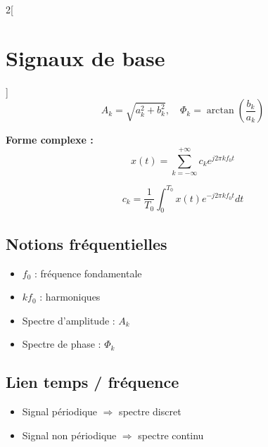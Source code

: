 \documentclass[a4paper,10pt]{article}
\begin{document}
\begin{multicols}{2}[
        \section{Signaux de base}
    ]
        \[
        A_k = \sqrt{a_k^2 + b_k^2}, \quad \Phi_k = \arctan\left(\frac{b_k}{a_k}\right)
        \]

        \textbf{Forme complexe :}
        \[
        x(t) = \sum_{k=-\infty}^{+\infty} c_k e^{j2\pi k f_0 t}
        \]

        \[
        c_k = \frac{1}{T_0} \int_0^{T_0} x(t)e^{-j2\pi k f_0 t} dt
        \]

        \subsection*{Notions fréquentielles}

        \begin{itemize}
            \item $f_0$ : fréquence fondamentale
            \item $k f_0$ : harmoniques
            \item Spectre d'amplitude : $A_k$
            \item Spectre de phase : $\Phi_k$
        \end{itemize}


        
        \subsection*{Lien temps / fréquence}

        \begin{itemize}
            \item Signal périodique $\Rightarrow$ spectre discret
            \item Signal non périodique $\Rightarrow$ spectre continu
        \end{itemize}
            
    \end{multicols}

    \clearpage
\end{document}
